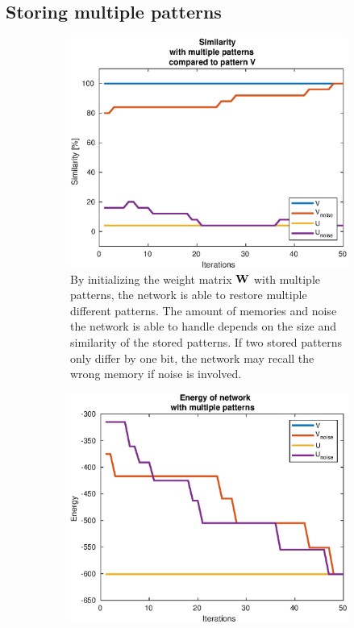 \subsection{Storing multiple patterns}
\begin{figure}[H]
    \centering
    \captionsetup[subfigure]{width=0.9\textwidth, justification=raggedright}
    \begin{subfigure}{0.49\textwidth}
        \includegraphics[width=\textwidth]{figs/multiple-patterns.eps}
        \caption{By initializing the weight matrix $\bf W$ with multiple patterns, the network is able to restore multiple different patterns. The amount of memories and noise the network is able to handle depends on the size and similarity of the stored patterns. If two stored patterns only differ by one bit, the network may recall the wrong memory if noise is involved. }
        \label{fig:multiple-similarity}
    \end{subfigure}
    \begin{subfigure}{0.49\textwidth}
        \includegraphics[width=\textwidth]{figs/multiple-patterns-energy.eps}

\end{subfigure}
\end{figure}
